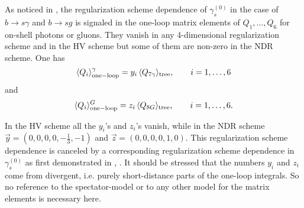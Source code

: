 As noticed in \cite{CFMRS:93}, \cite{CFRS:94} the regularization scheme
dependence of $\gamma^{(0)}_s$ in the case of $b\to s\gamma$ and
$b\to s g$ is signaled in the one-loop matrix elements of $Q_1,\ldots,Q_6$
for on-shell photons or gluons.  They vanish in any 4-dimensional
regularization scheme and in the HV scheme but some of them are
non-zero in the NDR scheme.  One has
\begin{equation}
\langle Q_i \rangle_{\rm one-loop}^\gamma =
y_i \, \langle Q_{7\gamma} \rangle_{\rm tree},
\qquad i=1,\ldots,6
\label{eq:defy}
\end{equation}
and
\begin{equation}
\langle Q_i\rangle_{\rm one-loop}^G =
z_i \, \langle Q_{8G} \rangle_{\rm tree},
\qquad i=1,\ldots,6.
\end{equation}

In the HV scheme all the $y_i$'s and $z_i$'s vanish, while in the NDR
scheme $\vec{y} = (0,0,0,0,-\frac{1}{3},-1)$ and $\vec{z} =
(0,0,0,0,1,0)$.  This regularization scheme dependence is canceled by a
corresponding regularization scheme dependence in $\gamma_s^{(0)}$
as first demonstrated in \cite{CFMRS:93}, \cite{CFRS:94}. It should be
stressed that the numbers $y_i$ and $z_i$ come from divergent, i.e.
purely short-distance parts of the one-loop integrals. So no reference
to the spectator-model or to any other model for the matrix elements is
necessary here.


